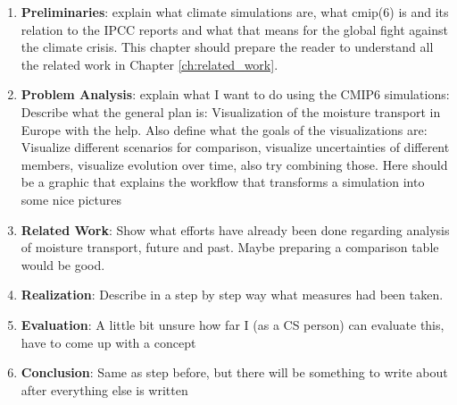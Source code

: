 \begin{enumerate}
  \item \textbf{Preliminaries}: explain what climate simulations are, what cmip(6) is and its relation to the IPCC reports and what that means for the global fight against the climate crisis. 
    This chapter should prepare the reader to understand all the related work in Chapter \ref{ch:related_work}.
  \item \textbf{Problem Analysis}: explain what I want to do using the CMIP6 simulations: Describe what the general plan is: Visualization of the moisture transport in Europe with the help. 
    Also define what the goals of the visualizations are: Visualize different scenarios for comparison, visualize uncertainties of different members, visualize evolution over time, also try combining those. 
    Here should be a graphic that explains the workflow that transforms a simulation into some nice pictures
  \item \textbf{Related Work}: Show what efforts have already been done regarding analysis of moisture transport, future and past. 
    Maybe preparing a comparison table would be good. 
  \item \textbf{Realization}: Describe in a step by step way what measures had been taken. 
  \item \textbf{Evaluation}: A little bit unsure how far I (as a CS person) can evaluate this, have to come up with a concept
  \item \textbf{Conclusion}: Same as step before, but there will be something to write about after everything else is written
  
\end{enumerate}

